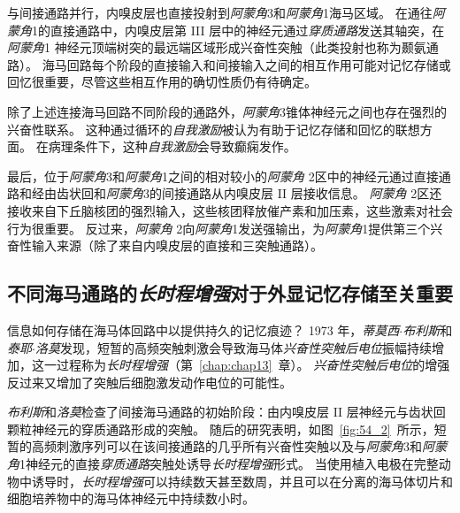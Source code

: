 与间接通路并行，内嗅皮层也直接投射到\textit{阿蒙角}3和\textit{阿蒙角}1海马区域。
在通往\textit{阿蒙角}1的直接通路中，内嗅皮层第 III 层中的神经元通过\textit{穿质通路}发送其轴突，在\textit{阿蒙角}1 神经元顶端树突的最远端区域形成兴奋性突触（此类投射也称为颞氨通路）。
海马回路每个阶段的直接输入和间接输入之间的相互作用可能对记忆存储或回忆很重要，尽管这些相互作用的确切性质仍有待确定。


除了上述连接海马回路不同阶段的通路外，\textit{阿蒙角}3锥体神经元之间也存在强烈的兴奋性联系。
这种通过循环的\textit{自我激励}被认为有助于记忆存储和回忆的联想方面。
在病理条件下，这种\textit{自我激励}会导致癫痫发作。


最后，位于\textit{阿蒙角}3和\textit{阿蒙角}1之间的相对较小的\textit{阿蒙角} 2区中的神经元通过直接通路和经由齿状回和\textit{阿蒙角}3的间接通路从内嗅皮层 II 层接收信息。
\textit{阿蒙角} 2区还接收来自下丘脑核团的强烈输入，这些核团释放催产素和加压素，这些激素对社会行为很重要。
反过来，\textit{阿蒙角} 2向\textit{阿蒙角}1发送强输出，为\textit{阿蒙角}1提供第三个兴奋性输入来源（除了来自内嗅皮层的直接和三突触通路）。



\subsection{不同海马通路的\textit{长时程增强}对于外显记忆存储至关重要}

信息如何存储在海马体回路中以提供持久的记忆痕迹？
1973 年，\textit{蒂莫西$\cdot$布利斯}和\textit{泰耶$\cdot$洛莫}发现，短暂的高频突触刺激会导致海马体\textit{兴奋性突触后电位}振幅持续增加，这一过程称为\textit{长时程增强}（第~\ref{chap:chap13}~章）。
\textit{兴奋性突触后电位}的增强反过来又增加了突触后细胞激发动作电位的可能性。


\textit{布利斯}和\textit{洛莫}检查了间接海马通路的初始阶段：由内嗅皮层 II 层神经元与齿状回颗粒神经元的穿质通路形成的突触。
随后的研究表明，如图~\ref{fig:54_2}~所示，短暂的高频刺激序列可以在该间接通路的几乎所有兴奋性突触以及与\textit{阿蒙角}3和\textit{阿蒙角}1神经元的直接\textit{穿质通路}突触处诱导\textit{长时程增强}形式。
当使用植入电极在完整动物中诱导时，\textit{长时程增强}可以持续数天甚至数周，并且可以在分离的海马体切片和细胞培养物中的海马体神经元中持续数小时。


